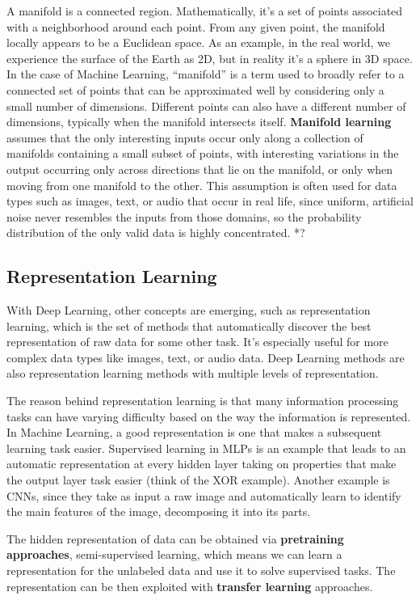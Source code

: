 A manifold is a connected region. Mathematically, it's a set of points associated with a neighborhood around each point. From any given point, the manifold locally appears to be a Euclidean space. As an example, in the real world, we experience the surface of the Earth as 2D, but in reality it's a sphere in 3D space. In the case of Machine Learning, ``manifold'' is a term used to broadly refer to a connected set of points that can be approximated well by considering only a small number of dimensions. Different points can also have a different number of dimensions, typically when the manifold intersects itself. \textbf{Manifold learning} assumes that the only interesting inputs occur only along a collection of manifolds containing a small subset of points, with interesting variations in the output occurring only across directions that lie on the manifold, or only when moving from one manifold to the other. This assumption is often used for data types such as images, text, or audio that occur in real life, since uniform, artificial noise never resembles the inputs from those domains, so the probability distribution of the only valid data is highly concentrated. *?

\subsection{Representation Learning}

With Deep Learning, other concepts are emerging, such as representation learning, which is the set of methods that automatically discover the best representation of raw data for some other task. It's especially useful for more complex data types like images, text, or audio data. Deep Learning methods are also representation learning methods with multiple levels of representation.

The reason behind representation learning is that many information processing tasks can have varying difficulty based on the way the information is represented. In Machine Learning, a good representation is one that makes a subsequent learning task easier. Supervised learning in MLPs is an example that leads to an automatic representation at every hidden layer taking on properties that make the output layer task easier (think of the XOR example). Another example is CNNs, since they take as input a raw image and automatically learn to identify the main features of the image, decomposing it into its parts.

The hidden representation of data can be obtained via \textbf{pretraining approaches}, semi-supervised learning, which means we can learn a representation for the unlabeled data and use it to solve supervised tasks. The representation can be then exploited with \textbf{transfer learning} approaches.

